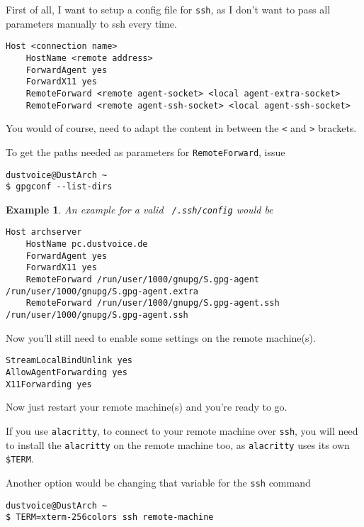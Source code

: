 \documentclass[9pt]{report}
\newtheorem{example}{Example}
\newenvironment{NOTE}
{\begin{tcolorbox}[colback=admonitionBG,coltitle=draculaFG,colframe=draculaBlue,colbacktitle=draculaBlue,title=NOTE]}
{\end{tcolorbox}}
\begin{document}
First of all, I want to setup a config file for \texttt{ssh}, as I don’t want to pass all parameters manually to ssh every time.


\begin{verbatim}
Host <connection name>
    HostName <remote address>
    ForwardAgent yes
    ForwardX11 yes
    RemoteForward <remote agent-socket> <local agent-extra-socket>
    RemoteForward <remote agent-ssh-socket> <local agent-ssh-socket>
\end{verbatim}

\begin{NOTE}
    You would of course, need to adapt the content in between the \texttt{<} and \texttt{>} brackets.


    To get the paths needed as parameters for \texttt{RemoteForward}, issue


    \begin{verbatim}
dustvoice@DustArch ~
$ gpgconf --list-dirs
    \end{verbatim}
\end{NOTE}

\begin{example}
    An example for a valid \texttt{~/.ssh/config} would be


    \begin{verbatim}
Host archserver
    HostName pc.dustvoice.de
    ForwardAgent yes
    ForwardX11 yes
    RemoteForward /run/user/1000/gnupg/S.gpg-agent /run/user/1000/gnupg/S.gpg-agent.extra
    RemoteForward /run/user/1000/gnupg/S.gpg-agent.ssh /run/user/1000/gnupg/S.gpg-agent.ssh
    \end{verbatim}
\end{example}

Now you’ll still need to enable some settings on the remote machine(s).


\begin{verbatim}
StreamLocalBindUnlink yes
AllowAgentForwarding yes
X11Forwarding yes
\end{verbatim}

Now just restart your remote machine(s) and you’re ready to go.


\begin{NOTE}
    If you use \texttt{alacritty}, to connect to your remote machine over \texttt{ssh}, you will need to install the \texttt{alacritty} on the remote machine too, as \texttt{alacritty} uses its own \texttt{\$TERM}.


    Another option would be changing that variable for the \texttt{ssh} command


    \begin{verbatim}
dustvoice@DustArch ~
$ TERM=xterm-256colors ssh remote-machine
    \end{verbatim}
\end{NOTE}
\end{document}
